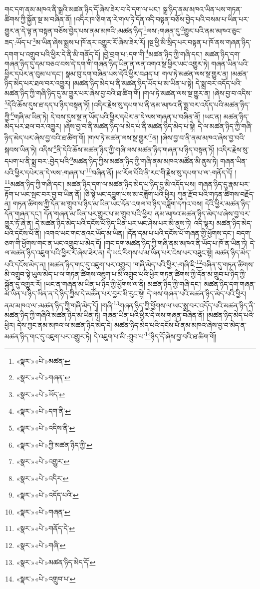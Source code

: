 གང་དག་ནམ་མཁའ་ནི་སྒྲའི་མཚན་ཉིད་དོ་ཞེས་ཟེར་བ་དེ་དག་ལ་ཡང་། སྒྲ་ཉིད་ནམ་མཁའ་ཡིན་པས་གཏན་ཚིགས་ཀྱི་སྐྱོན་སྔ་མ་བཞིན་ནོ། །འདིར་ཁ་ཅིག་ན་རེ་གལ་ཏེ་དོན་འདི་བསྟན་བཅོས་བྱེད་པའི་བསམ་པ་ཡིན་པར་གྱུར་ན་དེ་ལྟ་ན་བསྟན་བཅོས་བྱེད་པས་ནམ་མཁའི་:མཚན་ཉིད་\footnote{«སྣར་»«པེ་»མཚན་}ལས་:གཞན་དུ་\footnote{«སྣར་»«པེ་»གཞན་}གྱུར་པའི་ནམ་མཁའ་ཅུང་ཟད་:ཡོད་པ་\footnote{«སྣར་»«པེ་»ཡོད་}མ་ཡིན་ཞེས་སྨྲས་པ་ཁོ་ནར་འགྱུར་རོ་ཞེས་ཟེར་རོ། །སྔ་ཕྱི་མི་སྲིད་པར་བསྟན་པ་ཁོ་ནས་གཞན་ཉིད་དགག་པ་འགྲུབ་པའི་ཕྱིར་དེ་ནི་མི་གནོད་དོ། །བྱེ་བྲག་པ་:དག་གི་\footnote{«སྣར་»«པེ་»དག་ནི་}མཚན་ཉིད་ཀྱི་གཞི་དང་། མཚན་ཉིད་དག་གཞན་ཉིད་དུ་དམ་བཅའ་བས་དེ་དག་གི་གཞན་ཉིད་ཡིན་ན་ལན་འགའ་སྔ་ཕྱིར་ཡང་འགྱུར་ཏེ། གཞན་ཡིན་པའི་ཕྱིར་དཔེར་ན་བུམ་པ་དང་། སྣམ་བུ་དག་བཞིན་པས་དེའི་ཕྱིར་བཤད་པ། གལ་ཏེ་མཚན་ལས་སྔ་གྱུར་ན། །མཚན་ཉིད་མེད་པར་ཐལ་བར་འགྱུར། །མཚན་ཉིད་མེད་པ་ནི་མཚན་ཉིད་ཡོད་པ་མ་ཡིན་པ་སྟེ། དེ་སྨྲ་བར་འདོད་པའི་མཚན་ཉིད་ཀྱི་གཞི་ཉིད་དུ་མ་གྱུར་པར་ཞེས་བྱ་བའི་ཐ་ཚིག་གོ། །གལ་ཏེ་མཚན་ལས་སྔ་གྱུར་ན། །ཞེས་བྱ་བ་འདིས་\footnote{«སྣར་»«པེ་»འདིས་ནི་}དེའི་ཆོས་དུས་ཐ་དད་པ་ཉིད་བསྟན་ཏོ། །འདིར་རྗེས་སུ་དཔག་པ་ནི་ནམ་མཁའ་ནི་སྨྲ་བར་འདོད་པའི་མཚན་ཉིད་ཀྱི་\footnote{«སྣར་»«པེ་»ཀྱི་མཚན་ཉིད་ཀྱི་}གཞི་མ་ཡིན་ཏེ། དེ་བས་དུས་སྔ་ན་ཡོད་པའི་ཕྱིར་དཔེར་ན་དེ་ལས་གཞན་པ་བཞིན་ནོ། །ཡང་ན། མཚན་ཉིད་མེད་པར་ཐལ་བར་འགྱུར། །ཞེས་བྱ་བ་ནི་མཚན་ཉིད་ལ་མེད་པ་ནི་མཚན་ཉིད་མེད་པ་སྟེ། དེ་ལ་མཚན་ཉིད་ཀྱི་གཞི་ཉིད་མེད་པར་ཞེས་བྱ་བའི་ཐ་ཚིག་གོ། །གལ་ཏེ་མཚན་ལས་སྔ་གྱུར་\footnote{«སྣར་»«པེ་»འགྱུར་}ན། །ཞེས་བྱ་བ་ནི་ནམ་མཁའ་ཞེས་བྱ་བའི་སྐབས་ཡིན་ཏེ། འདིས་\footnote{«སྣར་»«པེ་»འདིར་}ནི་དེའི་ཆོས་མཚན་ཉིད་ཀྱི་གཞི་ལས་མཚན་ཉིད་གཞན་པ་ཉིད་བསྟན་ཏོ། །འདིར་རྗེས་སུ་དཔག་པ་ནི་སྨྲ་བར་:བྱེད་པའི་\footnote{«སྣར་»«པེ་»འདོད་པའི་}མཚན་ཉིད་ཀྱིས་མཚན་ཉིད་ཀྱི་གཞི་ནམ་མཁའ་མཚོན་མི་ནུས་ཏེ། གཞན་ཡིན་པའི་ཕྱིར་དཔེར་ན་དེ་ལས་:གཞན་པ་\footnote{«སྣར་»«པེ་»གཞན་}བཞིན་ནོ། །ཕ་རོལ་པོའི་ནི་རང་གི་རྗེས་སུ་དཔག་པ་ལ་:གནོད་དོ། །\footnote{«སྣར་»«པེ་»གནོད་དེ་}མཚན་ཉིད་ཀྱི་གཞི་དང་། མཚན་ཉིད་དག་ལ་མཚན་ཉིད་མེད་པ་ཉིད་དུ་མི་འདོད་པས། གཞན་ཉིད་དུ་རྣམ་པར་རྟོག་པ་ཡང་སྤང་བར་བྱ་བ་ཡིན་ནོ། །ཅི་སྟེ་ཡང་དབྱུག་པས་མ་བཟློག་པའི་ཕྱིར། ཀུན་རྫོབ་པའི་གཏན་ཚིགས་བརྗོད་ན། གཏན་ཚིགས་ཀྱི་དོན་མ་གྲུབ་པ་ཉིད་མ་ཡིན་ཡང་དོན་འགལ་བ་ཉིད་བཟློག་དཀའ་བས། དེའི་ཕྱིར་མཚན་ཉིད་དོན་གཞན་དང་། དོན་གཞན་མ་ཡིན་པར་གྱུར་པ་མ་གྲུབ་པའི་ཕྱིར། ནམ་མཁའ་མཚན་ཉིད་མེད་པ་ཞེས་བྱ་བར་གྱུར་ཏོ་ཞེ་ན། དེ་མཚན་ཉིད་མེད་པའི་དངོས་པོ་ཉིད་ཡིན་པར་ཡང་ཤེས་པར་མི་ནུས་ཏེ། འདི་ལྟར། མཚན་ཉིད་མེད་པའི་དངོས་པོ་ནི། །འགའ་ཡང་གང་ནའང་ཡོད་མ་ཡིན། །དོན་དམ་པ་པའི་དངོས་པོ་གཞན་གྱི་ཕྱོགས་དང་། བདག་ཅག་གི་ཕྱོགས་གང་ན་ཡང་འགྲུབ་པ་མེད་དོ། །གང་དག་མཚན་ཉིད་ཀྱི་གཞི་ནམ་མཁའ་ནི་ཡོད་པ་ཁོ་ན་ཡིན་ཏེ། དེ་ལ་མཚན་ཉིད་འཇུག་པའི་ཕྱིར་རོ་ཞེས་ཟེར་ན། དེ་ཡང་རིགས་པ་མ་ཡིན་པར་ངེས་པར་བཟུང་སྟེ། མཚན་ཉིད་མེད་པའི་དངོས་མེད་ན། །མཚན་ཉིད་གང་དུ་འཇུག་པར་འགྱུར། །གཞི་མེད་པའི་ཕྱིར་:གཞི་ཇི་\footnote{«སྣར་»«པེ་»གཞི་}བཞིན་དུ་གཏན་ཚིགས་མི་འགྲུབ་སྟེ་ཡུལ་མེད་པ་ལ་གཏན་ཚིགས་འཇུག་པ་མི་འགྲུབ་པའི་ཕྱིར་གཏན་ཚིགས་ཀྱི་དོན་མ་གྲུབ་པ་ཉིད་ཀྱི་སྐྱོན་དུ་འགྱུར་རོ། །ཡང་ན་གཞན་མ་ཡིན་པ་ཉིད་ཀྱི་ཕྱོགས་ལ་ནི། མཚན་ཉིད་ཀྱི་གཞི་དང་། མཚན་ཉིད་དག་གཞན་མ་ཡིན་པ་ཉིད་ཡིན་ན་དེ་ཉིད་ཀྱིས་དེ་མཚོན་པར་བྱར་མི་རུང་སྟེ། དེ་ལས་གཞན་པའི་མཚན་ཉིད་མེད་པའི་ཕྱིར། ནམ་མཁའ་ལ་:མཚན་ཉིད་ཀྱི་གཞི་མེད་དོ། །གཞི་\footnote{«སྣར་»«པེ་»མཚན་ཉིད་མེད་དོ་}གཞན་ཉིད་ཀྱི་ཕྱོགས་ལ་ཡང་སྨྲ་བར་འདོད་པའི་མཚན་ཉིད་ནི་མཚན་ཉིད་ཀྱི་གཞིའི་མཚན་ཉིད་མ་ཡིན་ཏེ། གཞན་ཡིན་པའི་ཕྱིར་དེ་ལས་གཞན་བཞིན་ནོ། །མཚན་ཉིད་མེད་པའི་ཕྱིར། དེས་ཀྱང་ནམ་མཁའ་ལ་མཚན་ཉིད་མེད་དེ། མཚན་ཉིད་མེད་པའི་དངོས་པོ་ནམ་མཁའ་ཞེས་བྱ་བ་མེད་ན་མཚན་ཉིད་གང་དུ་འཇུག་པར་འགྱུར་ཏེ། དེ་འཇུག་པ་མི་:གྲུབ་པ་\footnote{«སྣར་»«པེ་»འགྲུབ་པ་}ཉིད་དོ་ཞེས་བྱ་བའི་ཐ་ཚིག་གོ། 